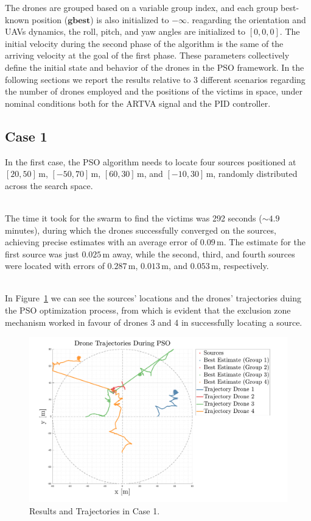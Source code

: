 The drones are grouped based on a variable group index, and 
each group best-known position ($\mathbf{gbest}$) is also 
initialized to \(-\infty\).
reagarding the orientation and UAVs dynamics, the roll, pitch, and yaw angles
are initialized to \([0, 0, 0]\).
The initial velocity during the second phase of the algorithm is the same
of the arriving velocity at the goal of the first phase.
These parameters collectively define the initial state and behavior of the 
drones in the PSO framework.
In the following sections we report the results relative to 3 different 
scenarios regarding the number of drones employed and the positions of the victims
in space, under nominal conditions both for the ARTVA signal and the PID controller.

\subsection{Case 1}
In the first case, the PSO algorithm needs to locate four sources positioned 
at \([20, 50] \, \text{m}\), \([-50, 70] \, \text{m}\), \([60, 30] \, \text{m}\), 
and \([-10, 30] \, \text{m}\), 
randomly distributed across the search space.

\noindent\\
The time it took for the swarm to find the victims was 292 seconds (\(\sim 4.9\) minutes),
during which the drones successfully converged on the sources, 
achieving precise estimates with an average error of \(0.09 \, \text{m}\). The estimate for the first source was 
just \(0.025 \, \text{m}\) away, while the second, third, and fourth sources were 
located with errors of \(0.287 \, \text{m}\), \(0.013 \, \text{m}\), and \(0.053 \, \text{m}\), respectively.

\noindent\\
In Figure~\ref{fig:case1} we can see  
the sources' locations and the drones' trajectories duing the PSO 
optimization process, from which is evident that the exclusion zone mechanism
worked in favour of drones 3 and 4 in successfully locating a source.

\begin{figure}
    \centering
    \includegraphics[width=1.06\textwidth]{images/case_1.pdf}
    \caption[PSO Case 1]{Results and Trajectories in Case 1.}
    \label{fig:case1}
\end{figure}

